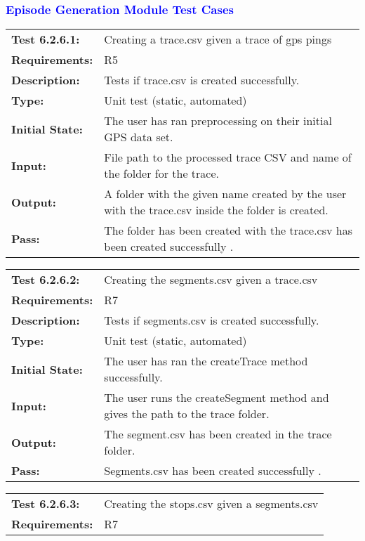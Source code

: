 \documentclass[12pt, titlepage]{article}
\begin{document}
\textcolor{blue}{
\subsubsection{Episode Generation Module Test Cases}
\begin{tabular}{|l|p{10cm}|}
    \hline
    \bf{Test} 6.2.6.1: & Creating a trace.csv given a trace of gps pings\\
    \bf{Requirements}: &  R5\\
    \bf{Description}: & Tests if trace.csv is created successfully. \\
    \bf{Type}: & Unit test (static, automated) \\
    \bf{Initial State}: & The user has ran preprocessing on their initial GPS data set. \\
    \bf{Input}: & File path to the processed trace CSV and name of the folder for the trace. \\
    \bf{Output}: & A folder with the given name created by the user with the trace.csv inside the folder is created. \\
    \bf{Pass}: & The folder has been created with the trace.csv has been created successfully . \\
    \hline
\end{tabular}
\begin{tabular}{|l|p{10cm}|}
    \hline
    \bf{Test} 6.2.6.2: & Creating the segments.csv given a trace.csv\\
    \bf{Requirements}: & R7 \\
    \bf{Description}: & Tests if segments.csv is created successfully. \\
    \bf{Type}: & Unit test (static, automated) \\
    \bf{Initial State}: & The user has ran the createTrace method successfully. \\
    \bf{Input}: & The user runs the createSegment method and gives the path to the trace folder. \\
    \bf{Output}: & The segment.csv has been created in the trace folder. \\
    \bf{Pass}: & Segments.csv has been created successfully . \\
    \hline
\end{tabular}
\begin{tabular}{|l|p{10cm}|}
    \hline
    \bf{Test} 6.2.6.3: & Creating the stops.csv given a segments.csv\\
    \bf{Requirements}: &  R7 \\

\end{tabular}}
\end{document}
